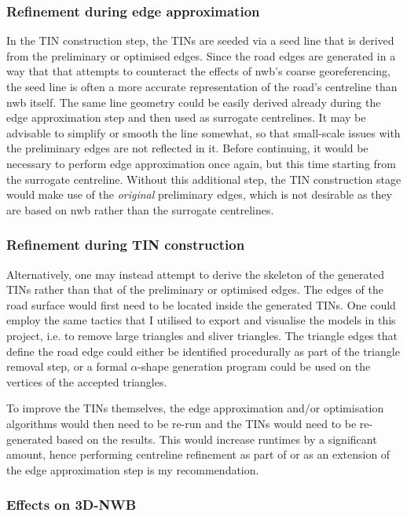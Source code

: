 \subsubsection{Refinement during edge approximation}

In the TIN construction step, the TINs are seeded via a seed line that is derived from the preliminary or optimised edges. Since the road edges are generated in a way that that attempts to counteract the effects of \ac{nwb}'s coarse georeferencing, the seed line is often a more accurate representation of the road's centreline than \ac{nwb} itself. The same line geometry could be easily derived already during the edge approximation step and then used as surrogate centrelines. It may be advisable to simplify or smooth the line somewhat, so that small-scale issues with the preliminary edges are not reflected in it. Before continuing, it would be necessary to perform edge approximation once again, but this time starting from the surrogate centreline. Without this additional step, the TIN construction stage would make use of the \textit{original} preliminary edges, which is not desirable as they are based on \ac{nwb} rather than the surrogate centrelines.

\subsubsection{Refinement during TIN construction}

Alternatively, one may instead attempt to derive the skeleton of the generated TINs rather than that of the preliminary or optimised edges. The edges of the road surface would first need to be located inside the generated TINs. One could employ the same tactics that I utilised to export and visualise the models in this project, i.e. to remove large triangles and sliver triangles. The triangle edges that define the road edge could either be identified procedurally as part of the triangle removal step, or a formal $\alpha$-shape generation program could be used on the vertices of the accepted triangles.

To improve the TINs themselves, the edge approximation and/or optimisation algorithms would then need to be re-run and the TINs would need to be re-generated based on the results. This would increase runtimes by a significant amount, hence performing centreline refinement as part of or as an extension of the edge approximation step is my recommendation.

\subsubsection{Effects on 3D-NWB}

